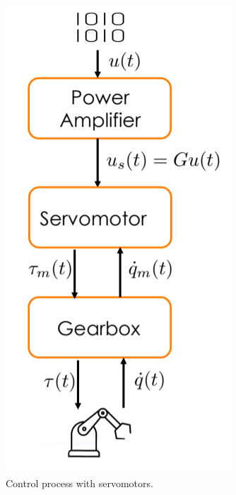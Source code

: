 \begin{figure}
  \includegraphics[width=\linewidth]{imgs/control_process_with_servomotors.png}
  \caption{Control process with servomotors.}
\end{figure}


